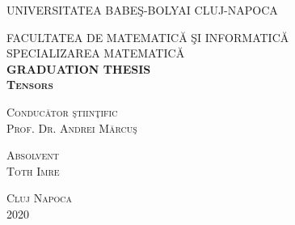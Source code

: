 \documentclass[12pt,a4paper]{article}
\begin{document}
\begin{titlepage}
\begin{center}

\textsc{ \large UNIVERSITATEA BABEŞ-BOLYAI CLUJ-NAPOCA}\\\medskip

\textsc{\large FACULTATEA DE MATEMATICĂ ŞI INFORMATICĂ}\\\medskip
\textsc{\large SPECIALIZAREA MATEMATICĂ }\\[4 cm]

\textsc{\LARGE\textbf{GRADUATION THESIS} }\\[1 cm]
\textsc{\LARGE\textbf{Tensors}}\\[7 cm]
\begin{flushleft}
\textsc{\Large Conducător ştiinţific}\\
\textsc{\Large Prof. Dr. Andrei Mărcuş }\\[2 cm]
\end{flushleft}
\begin{flushright}
\textsc{\Large Absolvent}\\
\textsc{\Large Toth Imre}\\[3 cm]
\end{flushright}
\textsc{\Large Cluj Napoca\\ 2020}
\end{center}
\end{titlepage}
\renewcommand{\contentsname}{Cuprins}
\renewcommand{\refname}{Bibliografie}
\setcounter{page}{0}
\tableofcontents
\newpage
\end{document}
